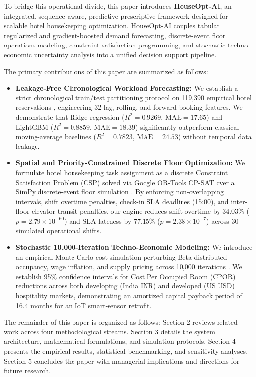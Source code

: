 \documentclass[11pt,a4paper]{article}
\begin{document}
To bridge this operational divide, this paper introduces \textbf{HouseOpt-AI}, an integrated, sequence-aware, predictive-prescriptive framework designed for scalable hotel housekeeping optimization. HouseOpt-AI couples tabular regularized and gradient-boosted demand forecasting, discrete-event floor operations modeling, constraint satisfaction programming, and stochastic techno-economic uncertainty analysis into a unified decision support pipeline.

The primary contributions of this paper are summarized as follows:
\begin{itemize}
    \item \textbf{Leakage-Free Chronological Workload Forecasting:} We establish a strict chronological train/test partitioning protocol on 119,390 empirical hotel reservations \cite{antonio2019}, engineering 32 lag, rolling, and forward booking features. We demonstrate that Ridge regression ($R^2 = 0.9269$, $\text{MAE} = 17.65$) \cite{hoerl1970} and LightGBM ($R^2 = 0.8859$, $\text{MAE} = 18.39$) significantly outperform classical moving-average baselines ($R^2 = 0.7823$, $\text{MAE} = 24.53$) without temporal data leakage.
    \item \textbf{Spatial and Priority-Constrained Discrete Floor Optimization:} We formulate hotel housekeeping task assignment as a discrete Constraint Satisfaction Problem (CSP) solved via Google OR-Tools CP-SAT \cite{perron2011,ortools2024} over a SimPy discrete-event floor simulation \cite{castillo2006,simpy2020}. By enforcing non-overlapping intervals, shift overtime penalties, check-in SLA deadlines (15:00), and inter-floor elevator transit penalties, our engine reduces shift overtime by 34.03\% ($p = 2.79 \times 10^{-60}$) and SLA lateness by 77.15\% ($p = 2.38 \times 10^{-7}$) across 30 simulated operational shifts.
    \item \textbf{Stochastic 10,000-Iteration Techno-Economic Modeling:} We introduce an empirical Monte Carlo cost simulation perturbing Beta-distributed occupancy, wage inflation, and supply pricing across 10,000 iterations \cite{metropolis1949}. We establish 95\% confidence intervals for Cost Per Occupied Room (CPOR) reductions across both developing (India INR) and developed (US USD) hospitality markets, demonstrating an amortized capital payback period of 16.4 months for an IoT smart-sensor retrofit.
\end{itemize}

The remainder of this paper is organized as follows: Section 2 reviews related work across four methodological streams. Section 3 details the system architecture, mathematical formulations, and simulation protocols. Section 4 presents the empirical results, statistical benchmarking, and sensitivity analyses. Section 5 concludes the paper with managerial implications and directions for future research.
\end{document}
